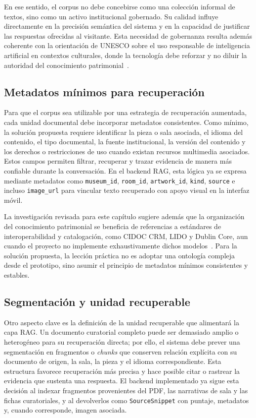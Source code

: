 En ese sentido, el corpus no debe concebirse como una colección informal de textos, sino como un activo institucional gobernado. Su calidad influye directamente en la precisión semántica del sistema y en la capacidad de justificar las respuestas ofrecidas al visitante. Esta necesidad de gobernanza resulta además coherente con la orientación de UNESCO sobre el uso responsable de inteligencia artificial en contextos culturales, donde la tecnología debe reforzar y no diluir la autoridad del conocimiento patrimonial~\cite{unescoaiculture2025}.

\subsection{Metadatos mínimos para recuperación}

Para que el corpus sea utilizable por una estrategia de recuperación aumentada, cada unidad documental debe incorporar metadatos consistentes. Como mínimo, la solución propuesta requiere identificar la pieza o sala asociada, el idioma del contenido, el tipo documental, la fuente institucional, la versión del contenido y los derechos o restricciones de uso cuando existan recursos multimedia asociados. Estos campos permiten filtrar, recuperar y trazar evidencia de manera más confiable durante la conversación. En el backend RAG, esta lógica ya se expresa mediante metadatos como \texttt{museum\_id}, \texttt{room\_id}, \texttt{artwork\_id}, \texttt{kind}, \texttt{source} e incluso \texttt{image\_url} para vincular texto recuperado con apoyo visual en la interfaz móvil.

La investigación revisada para este capítulo sugiere además que la organización del conocimiento patrimonial se beneficia de referencias a estándares de interoperabilidad y catalogación, como CIDOC CRM, LIDO y Dublin Core, aun cuando el proyecto no implemente exhaustivamente dichos modelos~\cite{cidoccrm,lido,dublincore}. Para la solución propuesta, la lección práctica no es adoptar una ontología compleja desde el prototipo, sino asumir el principio de metadatos mínimos consistentes y estables.

\subsection{Segmentación y unidad recuperable}

Otro aspecto clave es la definición de la unidad recuperable que alimentará la capa RAG. Un documento curatorial completo puede ser demasiado amplio o heterogéneo para su recuperación directa; por ello, el sistema debe prever una segmentación en fragmentos o \textit{chunks} que conserven relación explícita con su documento de origen, la sala, la pieza y el idioma correspondiente. Esta estructura favorece recuperación más precisa y hace posible citar o rastrear la evidencia que sustenta una respuesta. El backend implementado ya sigue esta decisión al indexar fragmentos provenientes del PDF, las narrativas de sala y las fichas curatoriales, y al devolverlos como \texttt{SourceSnippet} con puntaje, metadatos y, cuando corresponde, imagen asociada.

